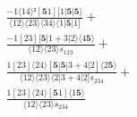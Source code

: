 \documentclass[varwidth, border=5pt]{standalone}
\begin{document}
\begin{my}
$\begin{gathered}
\scriptscriptstyle\frac{-1⟨14⟩²[𝟓1][1|𝟓|𝟓⟩}{⟨12⟩⟨23⟩⟨34⟩⟨1|𝟓|1]} +\\
\scriptscriptstyle\frac{-1[23][𝟓|1+3|2⟩⟨4𝟓⟩}{⟨12⟩⟨23⟩s_{123}} +\\
\scriptscriptstyle\frac{1[23]⟨24⟩[𝟓|𝟓|3+4|2]⟨2𝟓⟩}{⟨12⟩⟨23⟩⟨2|3+4|2]s_{234}} +\\
\scriptscriptstyle\frac{1[23]⟨24⟩[𝟓1]⟨1𝟓⟩}{⟨12⟩⟨23⟩s_{234}} \phantom{+}
\end{gathered}$
\end{my}
\end{document}

